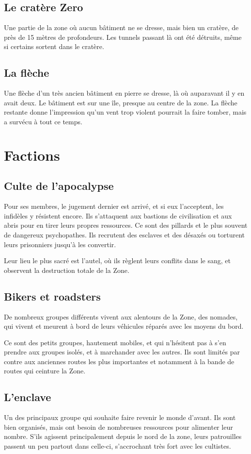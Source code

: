 \documentclass[10pt,a4paper]{article}
\begin{document}
\subsection{Le cratère Zero}
Une partie de la zone où aucun bâtiment ne se dresse, mais bien un cratère, de près de 15 mètres de profondeurs. Les tunnels passant là ont été détruits, même si certains sortent dans le cratère.
\subsection{La flèche}
Une flèche d'un très ancien bâtiment en pierre se dresse, là où auparavant il y en avait deux. Le bâtiment est sur une île, presque au centre de la zone. La flèche restante donne l'impression qu'un vent trop violent pourrait la faire tomber, mais a survécu à tout ce temps.
\section{Factions}
\subsection{Culte de l'apocalypse}
Pour ses membres, le jugement dernier est arrivé, et si eux l'acceptent, les infidèles y résistent encore. Ils s'attaquent aux bastions de civilisation et aux abris pour en tirer leurs propres ressources. Ce sont des pillards et le plus souvent de dangereux psychopathes. Ils recrutent des esclaves et des désaxés ou torturent leurs prisonniers jusqu'à les convertir.

Leur lieu le plus sacré est l'autel, où ils règlent leurs conflits dans le sang, et observent la destruction totale de la Zone.
\subsection{Bikers et roadsters}
De nombreux groupes différents vivent aux alentours de la Zone, des nomades, qui vivent et meurent à bord de leurs véhicules réparés avec les moyens du bord.

Ce sont des petits groupes, hautement mobiles, et qui n'hésitent pas à s'en prendre aux groupes isolés, et à marchander avec les autres. Ils sont limités par contre aux anciennes routes les plus importantes et notamment à la bande de routes qui ceinture la Zone.
\subsection{L'enclave}
Un des principaux groupe qui souhaite faire revenir le monde d'avant. Ils sont bien organisés, mais ont besoin de nombreuses ressources pour alimenter leur nombre. S'ils agissent principalement depuis le nord de la zone, leurs patrouilles passent un peu partout dans celle-ci, s'accrochant très fort avec les cultistes.
\end{document}
